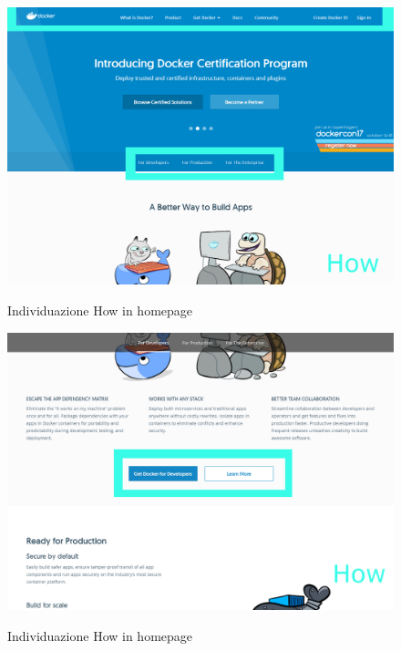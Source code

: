 \documentclass[a4paper]{article}
\begin{document}
\begin{figure}[H]
	\centering
	\includegraphics[width=\linewidth]{images/how1.png}
    \label{fig:homepagehow1}
    \caption{Individuazione How in homepage}
\end{figure}

\begin{figure}[H]
	\centering
	\includegraphics[width=\linewidth]{images/how2.png}
    \label{fig:homepagehow2}
    \caption{Individuazione How in homepage}
\end{figure}
\end{document}
